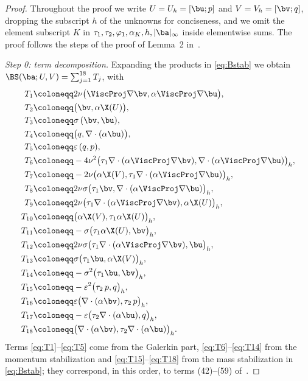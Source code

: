\begin{proof}
Throughout the proof we write $U=U_h=[\bu;p]$ and $V=V_h=[\bv;q]$, dropping the subscript
$h$ of the unknowns for conciseness, and we omit the element subscript $K$ in
$\tau_1,\tau_2,\varphi_1,\alpha_K,h,|\ba|_\infty$ inside elementwise sums. The proof
follows the steps of the proof of Lemma~2 in~\cite{codina2001stabilized}.

\medskip\noindent\emph{Step 0: term decomposition.}
Expanding the products in \eqref{eq:Bstab} we obtain
$\BS(\ba;U,V) = \sum_{j=1}^{18} T_j$, with
\begin{align}
  T_1 &\coloneqq 2\nu\bigl(\ViscProj\nabla\bv,\alpha\ViscProj\nabla\bu\bigr), \label{eq:T1}\\
  T_2 &\coloneqq \bigl(\bv,\alpha\X(U)\bigr), \label{eq:T2}\\
  T_3 &\coloneqq \sigma\,(\bv,\bu), \label{eq:T3}\\
  T_4 &\coloneqq \bigl(q,\nabla\cdot(\alpha\bu)\bigr), \label{eq:T4}\\
  T_5 &\coloneqq \varepsilon\,(q,p), \label{eq:T5}\\
  T_6 &\coloneqq -4\nu^2\bigl(\tau_1\nabla\cdot(\alpha\ViscProj\nabla\bv),
        \nabla\cdot(\alpha\ViscProj\nabla\bu)\bigr)_h, \label{eq:T6}\\
  T_7 &\coloneqq -2\nu\bigl(\alpha\X(V),
        \tau_1\nabla\cdot(\alpha\ViscProj\nabla\bu)\bigr)_h, \label{eq:T7}\\
  T_8 &\coloneqq 2\nu\sigma\bigl(\tau_1\bv,
        \nabla\cdot(\alpha\ViscProj\nabla\bu)\bigr)_h, \label{eq:T8}\\
  T_9 &\coloneqq 2\nu\bigl(\tau_1\nabla\cdot(\alpha\ViscProj\nabla\bv),
        \alpha\X(U)\bigr)_h, \label{eq:T9}\\
  T_{10} &\coloneqq \bigl(\alpha\X(V),\tau_1\alpha\X(U)\bigr)_h, \label{eq:T10}\\
  T_{11} &\coloneqq -\sigma\bigl(\tau_1\alpha\X(U),\bv\bigr)_h, \label{eq:T11}\\
  T_{12} &\coloneqq 2\nu\sigma\bigl(\tau_1\nabla\cdot(\alpha\ViscProj\nabla\bv),
        \bu\bigr)_h, \label{eq:T12}\\
  T_{13} &\coloneqq \sigma\bigl(\tau_1\bu,\alpha\X(V)\bigr)_h, \label{eq:T13}\\
  T_{14} &\coloneqq -\sigma^2\bigl(\tau_1\bu,\bv\bigr)_h, \label{eq:T14}\\
  T_{15} &\coloneqq -\varepsilon^2\bigl(\tau_2\,p,q\bigr)_h, \label{eq:T15}\\
  T_{16} &\coloneqq \varepsilon\bigl(\nabla\cdot(\alpha\bv),\tau_2\,p\bigr)_h, \label{eq:T16}\\
  T_{17} &\coloneqq -\varepsilon\bigl(\tau_2\nabla\cdot(\alpha\bu),q\bigr)_h, \label{eq:T17}\\
  T_{18} &\coloneqq \bigl(\nabla\cdot(\alpha\bv),\tau_2\nabla\cdot(\alpha\bu)\bigr)_h .
        \label{eq:T18}
\end{align}
Terms \eqref{eq:T1}--\eqref{eq:T5} come from the Galerkin part,
\eqref{eq:T6}--\eqref{eq:T14} from the momentum stabilization and
\eqref{eq:T15}--\eqref{eq:T18} from the mass stabilization in \eqref{eq:Bstab}; they
correspond, in this order, to terms (42)--(59) of~\cite{codina2001stabilized}.


\end{proof}
